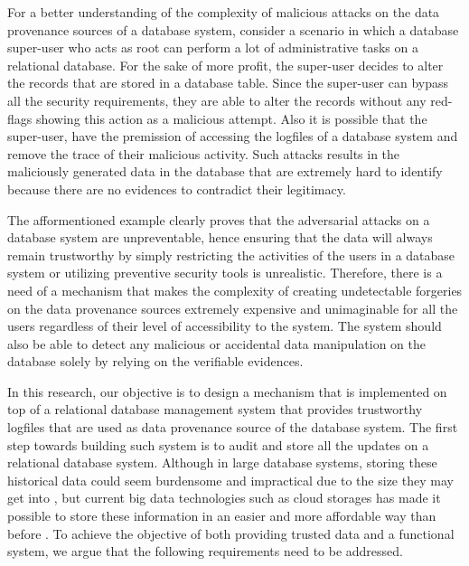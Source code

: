 		For a better understanding of the complexity of malicious attacks on the data provenance sources of a database system, consider a scenario in which a database super-user who acts as root can perform a lot of administrative tasks on a relational database. For the sake of more profit, the super-user decides to alter the records that are stored in a database table. Since the super-user can bypass all the security requirements, they are able to alter the records without any red-flags showing this action as a malicious attempt. Also it is possible that the super-user, have the premission of accessing the logfiles of a database system and remove the trace of their malicious activity. Such attacks results in the maliciously generated data in the database that are extremely hard to identify because there are no evidences to contradict their legitimacy.
		
		The afformentioned example clearly proves that the adversarial attacks on a database system are unpreventable, hence ensuring that the data will always remain trustworthy by simply restricting the activities of the users in a database system or utilizing preventive security tools is unrealistic. Therefore, there is a need of a mechanism that makes the complexity of creating undetectable forgeries on the data provenance sources extremely expensive and unimaginable for all the users regardless of their level of accessibility to the system. The system should also be able to detect any malicious or accidental data manipulation on the database solely by relying on the verifiable evidences.

		In this research, our objective is to design a mechanism that is implemented on top of a relational database management system that provides trustworthy logfiles that are used as data provenance source of the database system. The first step towards building such system is to audit and store all the updates on a relational database system. Although in large database systems, storing these historical data could seem burdensome and impractical due to the size they may get into \cite{crosby2009tamper-evident}, but current big data technologies such as cloud storages has made it possible to store these information in an easier and more affordable way than before \cite{talia2015dataanalysis}. To achieve the objective of both providing trusted data and a functional system, we argue that the following requirements need to be addressed.

